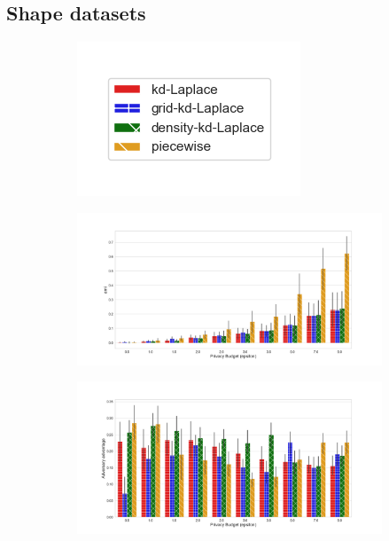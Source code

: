 {\subsection{Shape datasets}

\begin{figure}[H]
  \centering
  \begin{subfigure}{0.30\textwidth}
    \includegraphics[width=\textwidth]{Results/kd-laplace/ami_bar_comparison_legend.png}
  \end{subfigure}
  \begin{subfigure}{1\textwidth}
    \includegraphics[width=1\textwidth]{Results/nd-laplace/ami_circle-dataset_comparison.png}
  \end{subfigure}
  \begin{subfigure}{1\textwidth}
    \includegraphics[width=1\textwidth]{Results/nd-laplace/shokri_mi_adv_circle-dataset_comparison.png}

\end{subfigure}
\end{figure}}
